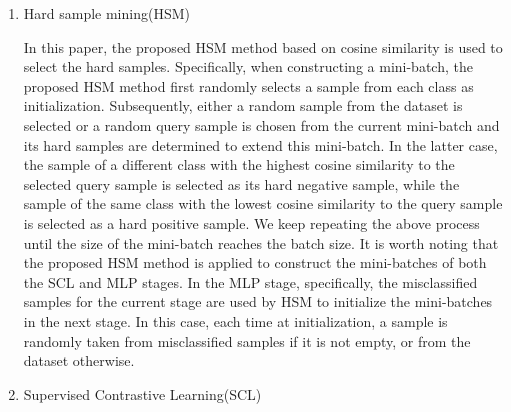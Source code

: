 \documentclass[lettersize,journal]{IEEEtran}
\begin{document}
\begin{enumerate}


\item Hard sample mining(HSM)

In this paper, the proposed HSM method based on cosine similarity is used to select the hard samples. Specifically, when constructing a mini-batch, the proposed HSM method first randomly selects a sample from each class as initialization. Subsequently, either a random sample from the dataset is selected or a random query sample is chosen from the current mini-batch and its hard samples are determined to extend this mini-batch. In the latter case, the sample of a different class with the highest cosine similarity to the selected query sample is selected as its hard negative sample, while the sample of the same class with the lowest cosine similarity to the query sample is selected as a hard positive sample. We keep repeating the above process until the size of the mini-batch reaches the batch size. It is worth noting that the proposed HSM method is applied to construct the mini-batches of both the SCL and MLP stages. In the MLP stage, specifically, the misclassified samples for the current stage are used by HSM to initialize the mini-batches in the next stage. In this case, each time at initialization, a sample is randomly taken from misclassified samples if it is not empty, or from the dataset otherwise. 


\item Supervised Contrastive Learning(SCL)


\end{enumerate}
\end{document}

